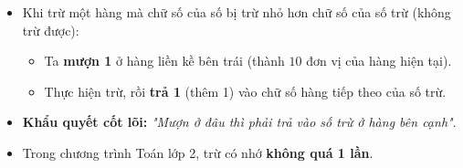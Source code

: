 \documentclass[10pt,a4paper]{article}
\begin{document}
\noindent
\begin{minipage}[t]{0.49\textwidth}\vspace{0pt}
\begin{tcolorbox}[
  enhanced,
  colback=violet!4!white,
  colframe=violet!75!black,
  arc=2mm, boxrule=0.8pt,
  left=2mm, right=2mm, top=1.8mm, bottom=1.8mm,
  title={\footnotesize\bfseries\color{white}\faKey\ 1. Quy tắc trừ có nhớ}
]
{\footnotesize
\begin{itemize}\setlength{\itemsep}{1pt}\setlength{\leftskip}{-2.5mm}
  \item Khi trừ một hàng mà chữ số của số bị trừ nhỏ hơn chữ số của số trừ (không trừ được):
  \begin{itemize}\setlength{\itemsep}{0.5pt}\setlength{\leftskip}{-2mm}
    \item Ta \textbf{mượn 1} ở hàng liền kề bên trái (thành $10$ đơn vị của hàng hiện tại).
    \item Thực hiện trừ, rồi \textbf{trả 1} (thêm 1) vào chữ số hàng tiếp theo của số trừ.
  \end{itemize}
  \item \textbf{Khẩu quyết cốt lõi:} \textit{"Mượn ở đâu thì phải trả vào số trừ ở hàng bên cạnh"}.
  \item Trong chương trình Toán lớp 2, trừ có nhớ \textbf{không quá 1 lần}.
\end{itemize}
}
\end{tcolorbox}
\end{minipage}
\hfill
\end{document}
